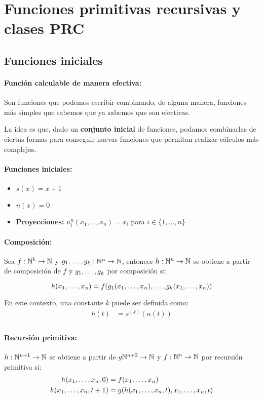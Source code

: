 	\section{Funciones primitivas recursivas y clases PRC}
	\subsection{Funciones iniciales}
	\paragraph{Función calculable de manera efectiva:} Son funciones que podemos escribir combinando, de alguna manera, funciones más simples que sabemos que ya sabemos que son efectivas.
	
	La idea es que, dado un \textbf{conjunto inicial} de funciones, podamos combinarlas de ciertas formas para conseguir nuevas funciones que permitan realizar cálculos más complejos.
	
	\paragraph{Funciones iniciales:}
	\begin{itemize}
		\item $s(x) = x + 1$
		\item $n(x) = 0$
		\item \textbf{Proyecciones:} $u_i^n(x_1,\dots,x_n) = x_i$ para $i\in\{1,\dots,n\}$
	\end{itemize}

	\paragraph{Composición:} Sea $f:\nat^k\to\nat$ y $\xDots{g}{k}:\nat^n\to\nat$, entonces $h:\nat^n\to\nat$ se obtiene a partir de composición de $f$ y $\xDots{g}{k}$ por composición si:
	
	$$h(\xDots{x}{n}) = \comp{f}{k}{g}{n}$$
	
	En este contexto, una constante $k$ puede ser definida como:
	\begin{align*}
	h(t) &= s^{(k)}(n(t)) \\
	\end{align*}
	
	\paragraph{Recursión primitiva:} $h:\nat^{n+1}\to\nat$ se obtiene a partir de $g\nat^{n+2}\to\nat$ y $f:\nat^n\to\nat$ por recursión primitiva si:
	\begin{align*}
		h(\xDots{x}{n}, 0) &= f(\xDots{x}{n}) \\
		h(\xDots{x}{n}, t+1) &= g(h(\xDots{x}{n}, t), \xDots{x}{n}, t) \\
	\end{align*}
	
